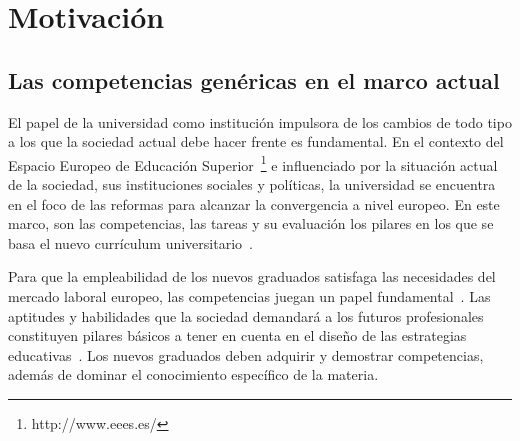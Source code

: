


\section{Motivación}
\label{sec:Motivation}

\subsection*{Las competencias genéricas en el marco actual}

El papel de la universidad como institución impulsora de los cambios de todo tipo a los que la sociedad actual debe hacer frente es fundamental. En el contexto del Espacio Europeo de Educación Superior~\footnote{http://www.eees.es/} e influenciado por la situación actual de  la sociedad, sus instituciones sociales y políticas, la universidad se encuentra en el foco de las reformas para alcanzar la convergencia a nivel europeo. En este marco, son las competencias, las tareas y su evaluación los pilares en los que se basa el nuevo currículum universitario~\cite{zabala2005espacio}.

Para que la empleabilidad de los nuevos graduados satisfaga las necesidades del mercado laboral europeo, las competencias juegan un papel fundamental~\cite{communique2012making}. Las aptitudes y habilidades que la sociedad demandará a los futuros profesionales constituyen pilares básicos a tener en cuenta en el diseño de las estrategias educativas~\cite{de2010project}. Los nuevos graduados deben adquirir y demostrar competencias, además de dominar el conocimiento específico de la materia.

